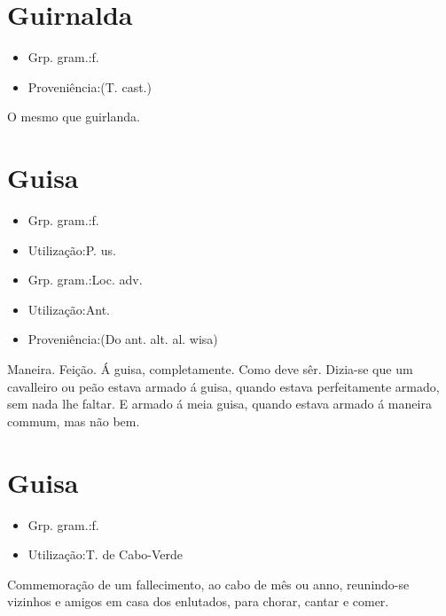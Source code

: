\section{Guirnalda}
\begin{itemize}
\item {Grp. gram.:f.}
\end{itemize}
\begin{itemize}
\item {Proveniência:(T. cast.)}
\end{itemize}
O mesmo que \textunderscore guirlanda\textunderscore .
\section{Guisa}
\begin{itemize}
\item {Grp. gram.:f.}
\end{itemize}
\begin{itemize}
\item {Utilização:P. us.}
\end{itemize}
\begin{itemize}
\item {Grp. gram.:Loc. adv.}
\end{itemize}
\begin{itemize}
\item {Utilização:Ant.}
\end{itemize}
\begin{itemize}
\item {Proveniência:(Do ant. alt. al. \textunderscore wisa\textunderscore )}
\end{itemize}
Maneira.
Feição.
\textunderscore Á guisa\textunderscore , completamente.
Como deve sêr.
Dizia-se que um cavalleiro ou peão estava armado á guisa, quando estava perfeitamente armado, sem nada lhe faltar.
E armado \textunderscore á meia guisa\textunderscore , quando estava armado á maneira commum, mas não bem.
\section{Guisa}
\begin{itemize}
\item {Grp. gram.:f.}
\end{itemize}
\begin{itemize}
\item {Utilização:T. de Cabo-Verde}
\end{itemize}
Commemoração de um fallecimento, ao cabo de mês ou anno, reunindo-se vizinhos e amigos em casa dos enlutados, para chorar, cantar e comer.
